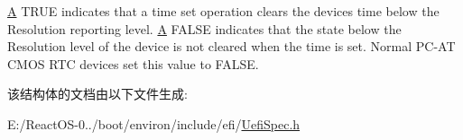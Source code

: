 \hyperlink{struct_a}{A} T\+R\+UE indicates that a time set operation clears the device\textquotesingle{}s time below the Resolution reporting level. \hyperlink{struct_a}{A} F\+A\+L\+SE indicates that the state below the Resolution level of the device is not cleared when the time is set. Normal P\+C-\/\+AT C\+M\+OS R\+TC devices set this value to F\+A\+L\+SE. 

该结构体的文档由以下文件生成\+:\begin{DoxyCompactItemize}
\item 
E\+:/\+React\+O\+S-\/0../boot/environ/include/efi/\hyperlink{_uefi_spec_8h}{Uefi\+Spec.\+h}\end{DoxyCompactItemize}

